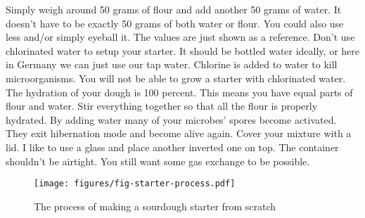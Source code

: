 Simply weigh around 50 grams of flour and add another 50
grams of water. It doesn't have to be exactly 50 grams of both
water or flour. You could also use less and/or simply eyeball it.
The values are just shown as a reference. Don't use chlorinated
water to setup your starter. It should be bottled water ideally,
or here in Germany we can just use our tap water. Chlorine
is added to water to kill microorganisms. You will not
be able to grow a starter with chlorinated water. The hydration
of your dough is 100 percent. This means you have equal parts
of flour and water. Stir everything together so that all the flour
is properly hydrated. By adding water many of your microbes'
spores become activated. They exit hibernation mode and
become alive again. Cover your mixture with a lid. I like to
use a glass and place another inverted one on top. The container shouldn't
be airtight. You still want some gas exchange to be possible.

\begin{figure}[!htb]
  \texttt{[image: figures/fig-starter-process.pdf]}
  \caption{The process of making a sourdough starter from scratch}
  \label{fig:sourdough-starter-process}
\end{figure}

